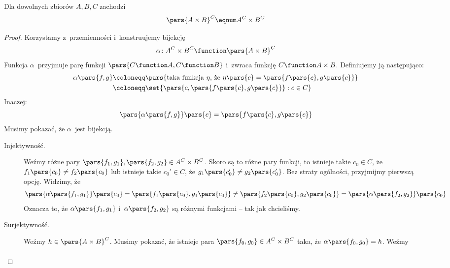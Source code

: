 \begin{theorem}
Dla dowolnych zbiorów \(A, B, C\) zachodzi
\begin{equation*}
    \pars{A \times B}^C \eqnum A^C \times B^C
\end{equation*}
\end{theorem}
\begin{proof}
Korzystamy z~przemienności i~konstruujemy bijekcję
\begin{equation*}
    \alpha\colon A^C \times B^C \function \pars{A \times B}^C
\end{equation*}
Funkcja \(\alpha\)~przyjmuje parę funkcji \(\pars{C \function A, C \function B}\) i~zwraca funkcję \(C \function A \times B\). Definiujemy ją następująco:
\begin{equation*}
    \begin{split}
        \alpha\pars{f, g}
            &\coloneqq \pars{\text{taka funkcja \(\eta\), że \(\eta\pars{c} = \pars{f\pars{c}, g\pars{c}}\)}}\\
            &\coloneqq \set{\pars{c, \pars{f\pars{c}, g\pars{c}}} : c \in C}
    \end{split}
\end{equation*}
Inaczej:
\begin{equation*}
    \pars{\alpha\pars{f, g}}\pars{c} = \pars{f\pars{c}, g\pars{c}}
\end{equation*}
Musimy pokazać, że \(\alpha\)~jest bijekcją.
\begin{description}
    \item[Injektywność.] Weźmy różne pary \(\pars{f_1, g_1}, \pars{f_2, g_2} \in A^C \times B^C\). Skoro są to różne pary funkcji, to istnieje takie \(c_0 \in C\), że \(f_1\pars{c_0} \neq f_2\pars{c_0}\) lub istnieje takie \(c_0' \in C\), że \(g_1\pars{c_0'} \neq g_2\pars{c_0'}\). Bez straty ogólności, przyjmijmy pierwszą opcję. Widzimy, że
    \begin{equation*}
        \pars{\alpha\pars{f_1, g_1}}\pars{c_0} = \pars{f_1\pars{c_0}, g_1\pars{c_0}} \neq \pars{f_2\pars{c_0}, g_2\pars{c_0}} = \pars{\alpha\pars{f_2, g_2}}\pars{c_0}
    \end{equation*}
    Oznacza to, że \(\alpha\pars{f_1, g_1}\) i~\(\alpha\pars{f_2, g_2}\) są różnymi funkcjami -- tak jak chcieliśmy.
    \item[Surjektywność.] Weźmy \(h \in \pars{A \times B}^C\). Musimy pokazać, że istnieje para \(\pars{f_0, g_0} \in A^C \times B^C\) taka, że \( \alpha\pars{f_0, g_0} = h \). Weźmy
        \begin{gather*}

\end{gather*}
\end{description}
\end{proof}

